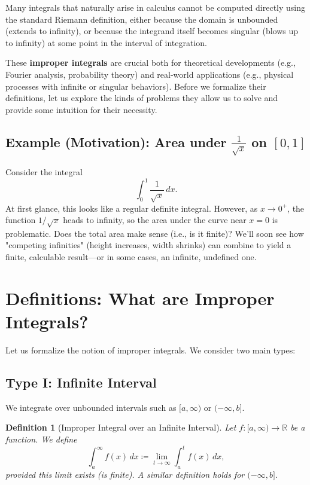 \documentclass[12pt]{article}
\newtheorem{definition}{Definition}[section]
\begin{document}
Many integrals that naturally arise in calculus cannot be computed directly using the standard Riemann definition, either because the domain is unbounded (extends to infinity), or because the integrand itself becomes singular (blows up to infinity) at some point in the interval of integration. 

These \textbf{improper integrals} are crucial both for theoretical developments (e.g., Fourier analysis, probability theory) and real-world applications (e.g., physical processes with infinite or singular behaviors). Before we formalize their definitions, let us explore the kinds of problems they allow us to solve and provide some intuition for their necessity.

\subsection*{Example (Motivation): Area under $\frac{1}{\sqrt{x}}$ on $[0,1]$}
Consider the integral
\[
\int_0^1 \frac{1}{\sqrt{x}}\,dx.
\]
At first glance, this looks like a regular definite integral. However, as $x\to0^+$, the function $1/\sqrt{x}$ heads to infinity, so the area under the curve near $x=0$ is problematic. Does the total area make sense (i.e., is it finite)? We'll soon see how "competing infinities" (height increases, width shrinks) can combine to yield a finite, calculable result---or in some cases, an infinite, undefined one.

\section{Definitions: What are Improper Integrals?}

Let us formalize the notion of improper integrals. We consider two main types:

\subsection{Type I: Infinite Interval}
We integrate over unbounded intervals such as $[a,\infty)$ or $(-\infty,b]$.

\begin{definition}[Improper Integral over an Infinite Interval]
Let $f:[a,\infty)\to\mathbb{R}$ be a function. We define
\[
\int_a^\infty f(x)\,dx \coloneqq \lim_{t\to\infty} \int_a^t f(x)\,dx,
\]
provided this limit exists (is finite). A similar definition holds for $(-\infty, b]$.
\end{definition}
\end{document}
